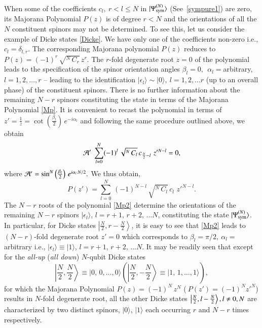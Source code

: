 When some of the coefficients $c_l,\ r< l\leq N$ in $\vert \Psi^{(N)}_{\rm sym}\rangle$ (See~\eqref{sympure1}) are zero, its Majorana Polynomial $P(z)$ is of degree $r<N$ and the orientations of all the $N$ constituent spinors may not be determined. To see this, let us consider the example of Dicke states \eqref{Dicke}. We have only one of the coefficients non-zero i.e., $c_l=\delta_{l,r}$.  The corresponding Majorana polynomial $P(z)$ reduces to  $P(z)=(-1)^r\, \sqrt{^N\, C_r}\, z^{r}$. The $r$-fold degenerate root  $z=0$ of the polynomial leads to the specification of the spinor orientation angles $\beta_l=0,\ \ \alpha_l=$arbitrary, $l=1,2,\ldots, r$ -- leading to the identification $\vert\epsilon_l\rangle\sim \vert 0\rangle,\ l=1,2,\ldots r$ (up to an overall phase) of the constituent spinors. There is no further information about the remaining $N-r$ spinors constituting the state in terms of the Majorana Polynomial \eqref{Mp}.  It is convenient to recast the  polynomial in terms of $z'=\frac{1}{z}=\cot \left(\frac{\beta_l}{2}\right)\,e^{-i\alpha_l}$ and following the same procedure outlined above, we obtain
\begin{equation}
{\cal A'}\  \sum_{l=0}^N (-1)^l\,\sqrt{^N\, C_l}\,  c_{\frac{N}{2}-l}\,  \, z'^{N-l}=0,\label{cmj03}  
\end{equation} 
where  ${\cal A'}=\sin^N\left(\frac{\beta_l}{2}\right)\,e^{i\alpha_l\, N/2}.$ We thus obtain, 
\begin{equation} 
P(z')=\sum_{l=0}^N\, (-1)^{N-l}\, \sqrt{^N\, C_l}\,  c_l\,  \, z'^{N-l}.\label{Mp2}
\end{equation}
The $N-r$ roots of the  polynomial \eqref{Mp2} determine the orientations of the remaining $N-r$ spinors $\vert\epsilon_l\rangle$, $l=r+1,\,r+2,\,\ldots N$, constituting the state $\vert \Psi^{(N)}_{\rm sym}\rangle$. In particular, for Dicke states $\left\vert \frac{N}{2},r-\frac{N}{2}\right\rangle$, it is easy to see that \eqref{Mp2} leads to $(N-r)$-fold degenerate root $z'=0$ which corresponds to $\beta_l=\pi/2,\ \alpha_l=$ arbitrary i.e., $\vert \epsilon_l \rangle \equiv \vert 1 \rangle$, $l=r+1,\,r+2,\, \ldots N$. It may be readily seen that except for the  {\em all-up} ({\em all down}) $N$-qubit Dicke states 
$$\left\vert \frac{N}{2}, \frac{N}{2}\right\rangle\equiv \vert 0,\,0,\ldots,0\rangle\left(\left\vert \frac{N}{2},-\frac{N}{2}\right\rangle\equiv \vert 1,\,1,\ldots,1 \rangle\right),$$ 
for which the Majorana Polynomial  $P(z)=(-1)^N\, z^N$ ($\ P(z')=(-1)^N z'^{N}$) results in $N$-fold degenerate root, all the other  Dicke states $\left\vert \frac{N}{2},l-\frac{N}{2}\right\rangle,\break l\neq 0, N$ are characterized by two distinct spinors, $\vert 0\rangle$, $\vert 1 \rangle$ each occurring $r$ and $N-r$ times respectively. 

